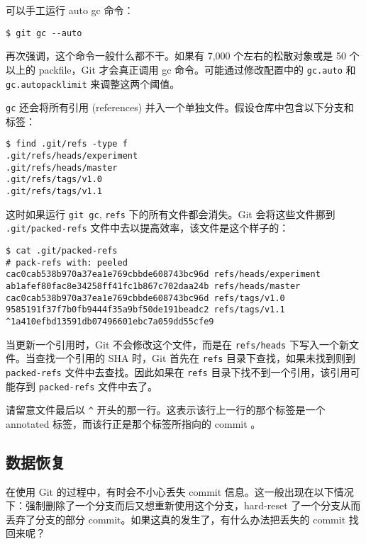 \documentclass[a4paper]{book}
\begin{document}
可以手工运行 auto gc 命令：

\begin{shaded}\begin{verbatim}
$ git gc --auto
\end{verbatim}\end{shaded}

再次强调，这个命令一般什么都不干。如果有 7,000 个左右的松散对象或是 50 个以上的 packfile，Git 才会真正调用 gc 命令。可能通过修改配置中的 \texttt{gc.auto} 和 \texttt{gc.autopacklimit} 来调整这两个阈值。

\texttt{gc} 还会将所有引用 (references) 并入一个单独文件。假设仓库中包含以下分支和标签：

\begin{shaded}\begin{verbatim}
$ find .git/refs -type f
.git/refs/heads/experiment
.git/refs/heads/master
.git/refs/tags/v1.0
.git/refs/tags/v1.1
\end{verbatim}\end{shaded}

这时如果运行 \texttt{git gc}, \texttt{refs} 下的所有文件都会消失。Git 会将这些文件挪到 \texttt{.git/packed-refs} 文件中去以提高效率，该文件是这个样子的：

\begin{shaded}\begin{verbatim}
$ cat .git/packed-refs
# pack-refs with: peeled
cac0cab538b970a37ea1e769cbbde608743bc96d refs/heads/experiment
ab1afef80fac8e34258ff41fc1b867c702daa24b refs/heads/master
cac0cab538b970a37ea1e769cbbde608743bc96d refs/tags/v1.0
9585191f37f7b0fb9444f35a9bf50de191beadc2 refs/tags/v1.1
^1a410efbd13591db07496601ebc7a059dd55cfe9
\end{verbatim}\end{shaded}

当更新一个引用时，Git 不会修改这个文件，而是在 \texttt{refs/heads} 下写入一个新文件。当查找一个引用的 SHA 时，Git 首先在 \texttt{refs} 目录下查找，如果未找到则到 \texttt{packed-refs} 文件中去查找。因此如果在 \texttt{refs} 目录下找不到一个引用，该引用可能存到 \texttt{packed-refs} 文件中去了。

请留意文件最后以 \texttt{\^{}} 开头的那一行。这表示该行上一行的那个标签是一个 annotated 标签，而该行正是那个标签所指向的 commit 。

\subsection{数据恢复}

在使用 Git 的过程中，有时会不小心丢失 commit 信息。这一般出现在以下情况下：强制删除了一个分支而后又想重新使用这个分支，hard-reset 了一个分支从而丢弃了分支的部分 commit。如果这真的发生了，有什么办法把丢失的 commit 找回来呢？
\end{document}
